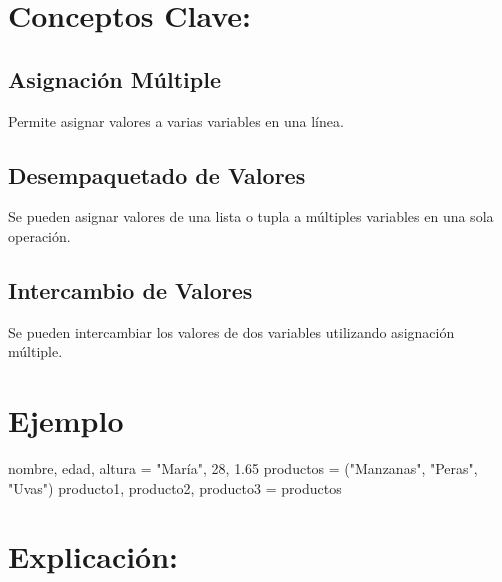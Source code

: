 \documentclass[
  a4paper,
  DIV=11,
  numbers=noendperiod,
  onepage,
  openany]{scrreprt}
\newenvironment{Shaded}{\begin{snugshade}}{\end{snugshade}}
\newcommand{\DecValTok}[1]{\textcolor[rgb]{0.68,0.00,0.00}{#1}}
\newcommand{\FloatTok}[1]{\textcolor[rgb]{0.68,0.00,0.00}{#1}}
\newcommand{\NormalTok}[1]{\textcolor[rgb]{0.00,0.23,0.31}{#1}}
\newcommand{\OperatorTok}[1]{\textcolor[rgb]{0.37,0.37,0.37}{#1}}
\newcommand{\StringTok}[1]{\textcolor[rgb]{0.13,0.47,0.30}{#1}}
\begin{document}
\hypertarget{conceptos-clave-12}{%
\section{Conceptos Clave:}\label{conceptos-clave-12}}

\hypertarget{asignaciuxf3n-muxfaltiple}{%
\subsection{Asignación Múltiple}\label{asignaciuxf3n-muxfaltiple}}

Permite asignar valores a varias variables en una línea.

\hypertarget{desempaquetado-de-valores}{%
\subsection{Desempaquetado de Valores}\label{desempaquetado-de-valores}}

Se pueden asignar valores de una lista o tupla a múltiples variables en
una sola operación.

\hypertarget{intercambio-de-valores}{%
\subsection{Intercambio de Valores}\label{intercambio-de-valores}}

Se pueden intercambiar los valores de dos variables utilizando
asignación múltiple.

\hypertarget{ejemplo-12}{%
\section{Ejemplo}\label{ejemplo-12}}

\begin{Shaded}
\begin{Highlighting}[]
\NormalTok{nombre, edad, altura }\OperatorTok{=} \StringTok{"María"}\NormalTok{, }\DecValTok{28}\NormalTok{, }\FloatTok{1.65}
\NormalTok{productos }\OperatorTok{=}\NormalTok{ (}\StringTok{"Manzanas"}\NormalTok{, }\StringTok{"Peras"}\NormalTok{, }\StringTok{"Uvas"}\NormalTok{)}
\NormalTok{producto1, producto2, producto3 }\OperatorTok{=}\NormalTok{ productos}
\end{Highlighting}
\end{Shaded}

\hypertarget{explicaciuxf3n-12}{%
\section{Explicación:}\label{explicaciuxf3n-12}}
\end{document}
